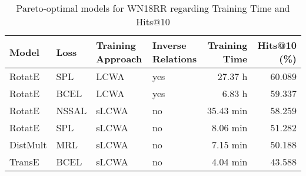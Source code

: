 \begin{table}[H]
\centering
\caption{Pareto-optimal models for WN18RR regarding Training Time and Hits@10}
\label{tab:skyline_wn18rr_training_time}
\begin{tabular}{llllrr}
\toprule
    Model &   Loss & Training Approach & Inverse Relations & Training Time &  Hits@10 (\%) \\
\midrule
   RotatE &    SPL &              LCWA &               yes &       27.37 h &       60.089 \\
   RotatE &   BCEL &              LCWA &               yes &        6.83 h &       59.337 \\
   RotatE &  NSSAL &             sLCWA &                no &     35.43 min &       58.259 \\
   RotatE &    SPL &             sLCWA &                no &      8.06 min &       51.282 \\
 DistMult &    MRL &             sLCWA &                no &      7.15 min &       50.188 \\
   TransE &   BCEL &             sLCWA &                no &      4.04 min &       43.588 \\
\bottomrule
\end{tabular}
\end{table}

